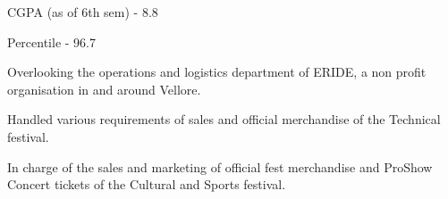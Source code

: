 









\divider\smallskip



\medskip


CGPA (as of 6th sem) - 8.8

\divider\smallskip

Percentile - 96.7

\medskip

Overlooking the operations and logistics department of ERIDE, a non profit organisation in and around Vellore.

\divider\smallskip

Handled various requirements of sales and official merchandise of the Technical festival.


\divider\smallskip

In charge of the sales and marketing of official fest merchandise and ProShow Concert tickets of the Cultural and Sports festival.